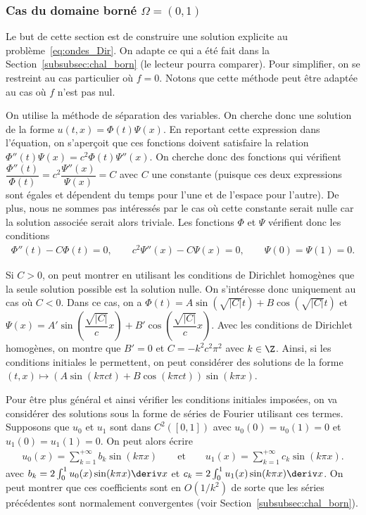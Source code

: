 \documentclass[12pt,a4paper,twoside]{article}
\begin{document}
\subsubsection{Cas du domaine born\'e $\Omega = (0,1)$}
\label{subsubsec:ondes_01}

Le but de cette section est de construire une solution explicite au
probl\`eme~\eqref{eq:ondes_Dir}.
On adapte ce qui a \'et\'e fait dans la Section~\ref{subsubsec:chal_born}
(le lecteur pourra comparer).
Pour simplifier, on se restreint au cas particulier o\`u $f = 0$.
Notons que cette m\'ethode peut \^etre adapt\'ee au cas o\`u $f$ n'est pas nul.

On utilise la m\'ethode de s\'eparation des variables.
On cherche donc une solution de la forme $u(t,x) = \Phi(t) \Psi(x)$.
En reportant cette expression dans l'\'equation, on s'aper\c{c}oit 
que ces fonctions doivent satisfaire la relation
$\Phi''(t) \Psi(x) = c^2 \Phi(t) \Psi''(x)$.
On cherche donc des fonctions qui v\'erifient
$\dfrac{\Phi''(t)}{\Phi(t)} = c^2 \dfrac{\Psi''(x)}{\Psi(x)} = C$
avec $C$ une constante (puisque ces deux expressions sont \'egales 
et d\'ependent du temps pour l'une et de l'espace pour l'autre).
De plus, nous ne sommes pas int\'eress\'es par le cas o\`u cette
constante serait nulle car la solution associ\'ee serait alors triviale.
Les fonctions $\Phi$ et $\Psi$ v\'erifient donc les conditions
\begin{align*}
  \Phi''(t) - C \Phi(t) = 0 , 
  \qquad
  c^2 \Psi''(x) - C \Psi(x) = 0 ,
  \qquad
  \Psi(0) = \Psi(1) = 0 .
\end{align*}

Si $C > 0$, on peut montrer en utilisant les conditions de Dirichlet homog\`enes
que la seule solution possible est la solution nulle.
On s'int\'eresse donc uniquement au cas o\`u $C < 0$.
Dans ce cas, on a $\Phi(t) = A \sin(\sqrt{|C|} t) + B \cos(\sqrt{|C|} t)$
et $\Psi(x) = A' \sin(\dfrac{\sqrt{|C|}}{c} x) + B' \cos(\dfrac{\sqrt{|C|}}{c} x)$.
Avec les conditions de Dirichlet homog\`enes, on montre
que $B' = 0$ et $C = - k^2 c^2 \pi^2$ avec $k \in \Z$.
Ainsi, si les conditions initiales le permettent, on peut consid\'erer
des solutions de la forme
$(t,x) \mapsto (A \sin(k\pi c t) + B \cos(k\pi c t)) \sin(k \pi x)$.


Pour \^etre plus g\'en\'eral et ainsi v\'erifier les conditions initiales impos\'ees,
on va consid\'erer des solutions 
sous la forme de s\'eries de Fourier utilisant ces termes.
Supposons que $u_0$ et $u_1$ sont dans $C^{2}([0,1])$
avec $u_0(0) = u_0(1) = 0$
et $u_1(0) = u_1(1) = 0$.
On peut alors \'ecrire
\begin{align*}
  u_0(x) = \sum\limits_{k=1}^{+\infty} b_k \sin (k \pi x)
  \qquad \text{et} \qquad
  u_1(x) = \sum\limits_{k=1}^{+\infty} c_k \sin (k \pi x) .
\end{align*}
avec $b_k = 2 \int_0^1 u_0(x) \sin(k \pi x) \deriv x$
et $c_k = 2 \int_0^1 u_1(x) \sin(k \pi x) \deriv x$.
On peut montrer que ces coefficients sont en $O(1/k^2)$ de sorte que les s\'eries
pr\'ec\'edentes sont normalement convergentes (voir Section~\ref{subsubsec:chal_born}).
\end{document}
